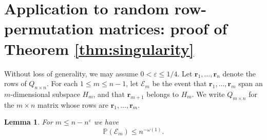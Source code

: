 \documentclass[reqno]{amsart}
\renewcommand\P{{\mathbb{P}}}
\newcommand\eps{{\varepsilon}}
\newcommand\BMr{{\bm r}}
\newcommand\CE{{\mathcal E}}
\theoremstyle{plain}
\newtheorem{lemma}[theorem]{Lemma}
\theoremstyle{definition}
\begin{document}
\section{Application to random row-permutation matrices: proof of Theorem \ref{thm:singularity}}\label{sect:singularity}

Without loss of generality, we may assume $0<\eps \le 1/4$. Let $\BMr_{1},\dots,\BMr_{n}$ denote the rows of $Q_{n\times n}$. For each
$1\le m\le n-1$, let $\CE_m$ be the event that $\BMr_{1},\dots,\BMr_{m}$ span
an $m$-dimensional subspace $H_m$, and that $\BMr_{m+1}$ belongs to $H_m$.
We write $Q_{m\times n}$ for the $m\times n$ matrix whose rows are
$\BMr_{1},\dots,\BMr_{m}$.

\begin{lemma}\label{lemma:small:m} For $m \le n-n^{\eps}$ we have 
$$\P(\CE_{m}) \le n^{-\omega(1)}.$$
\end{lemma}
\end{document}
